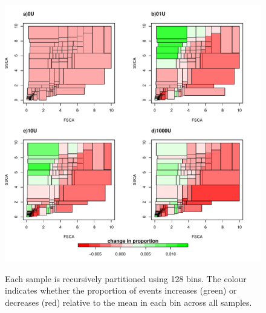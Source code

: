 \begin{figure}
 \centering
\begin{minipage}{.65\textwidth}
 \includegraphics[width=\linewidth]{figures/scatter-rpart-128bin-var-prop}
\end{minipage}
\begin{minipage}{.3\textwidth}
{Each sample is recursively partitioned using 128 bins.}
{
  The colour indicates whether the proportion of events increases (green) or decreases (red) relative to the mean in each bin across all samples.
}
\end{minipage}
\end{figure}

